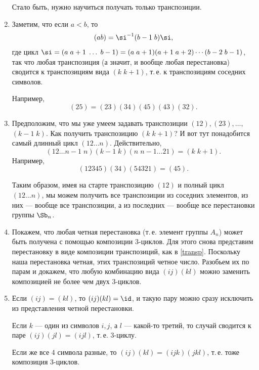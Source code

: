 \begin{enumerate}
Стало быть, нужно научиться получать только транспозиции.
\item Заметим, что если $a<b$, то
$$
(ab)=\si^{-1}(b-1\;b)\si,
$$
где цикл $\si = (a\;a+1\;\dots\;b-1)=(a\;a+1)(a+1\;a+2)\cdots(b-2\; b-1)$,
так что любая транспозиция (а значит, и вообще любая перестановка) сводится к транспозициям вида $(k\;k+1)$, т.\,е. к транспозициям соседних символов.

Например,
$$
(25) = (23)(34)(45)(43)(32).
$$
\item Предположим, что мы уже умеем задавать транспозиции $(12),(23),\dots,$ $(k-1\;k)$. Как получить транспозицию $(k\;k+1)$? И вот тут понадобится самый длинный цикл $(12\dots n)$. Действительно,
$$
(12\dots n-1\; n)(k-1\;k)(n\;n-1\dots 21)=(k\;k+1).
$$
Например,
$$
(12345)(34)(54321)=(45).
$$

Таким образом, имея на старте транспозицию $(12)$ и полный цикл $(12\dots n)$, мы можем получить все транспозиции из соседних элементов, из них --- вообще все транспозиции, а из последних --- вообще все перестановки группы $\Sb_n$.

\item Покажем, что любая четная перестановка (т.\,е. элемент группы $A_n$) может быть получена с помощью композиции 3-циклов.
Для этого снова представим перестановку в виде композиции транспозиций, как в \eqref{transp}. Поскольку наша перестановка четная, этих транспозиций четное число. Разобьем их по парам и докажем, что любую комбинацию вида $(ij)(kl)$ можно заменить композицией не более чем двух 3-циклов.

\item Если $(ij)=(kl)$, то $(ij)(kl)=\id$, и такую пару можно сразу исключить из представления четной перестановки.

Если $k$ --- один из символов $i,j$, а $l$ --- какой-то третий, то случай сводится к паре $(ij)(jl)=(ijl)$, т.\,е. 3-циклу.

Если же все 4 символа разные, то $(ij)(kl)=(ijk)(jkl)$, т.\,е. тоже композиция 3-циклов.


\end{enumerate}

